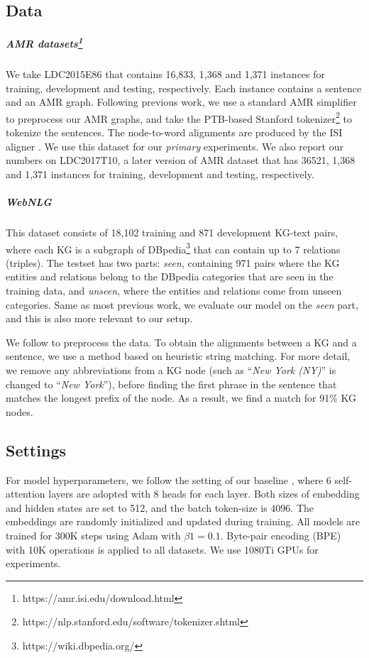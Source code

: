 \documentclass[11pt,a4paper]{article}
\begin{document}
\subsection{Data}


\subparagraph{AMR datasets\footnote{https://amr.isi.edu/download.html}} 
We take LDC2015E86 that contains 16,833, 1,368 and 1,371 instances for training, development and testing, respectively.
Each instance contains a sentence and an AMR graph.
Following previous work, we use a standard AMR simplifier \citep{konstas2017neural} to preprocess our AMR graphs, and take the PTB-based Stanford tokenizer\footnote{https://nlp.stanford.edu/software/tokenizer.shtml} to tokenize the sentences.
The node-to-word alignments are produced by the ISI aligner \citep{pourdamghani2014aligning}.
We use this dataset for our \emph{primary} experiments.
We also report our numbers on LDC2017T10, a later version of AMR dataset that has 36521, 1,368 and 1,371 instances for training, development and testing, respectively.


\subparagraph{WebNLG \citep{gardent2017webnlg}}
This dataset consists of 18,102 training and 871 development KG-text pairs, where each KG is a subgraph of DBpedia\footnote{https://wiki.dbpedia.org/} that can contain up to 7 relations (triples).
The testset has two parts: \emph{seen}, containing 971 pairs where the KG entities and relations belong to the DBpedia categories that are seen in the training data, and \emph{unseen}, where the entities and relations come from unseen categories.
Same as most previous work, we evaluate our model on the \emph{seen} part, and this is also more relevant to our setup.


We follow \citet{marcheggiani2018deep} to preprocess the data. 
To obtain 
the alignments between a KG and a sentence,
we use a method based on heuristic string matching.
For more detail, we remove any abbreviations from a KG node (such as ``\emph{New York (NY)}'' is changed to ``\emph{New York}''), before finding the first phrase in the sentence that matches the longest prefix of the node.
As a result, we find a match for 91\% KG nodes.


\subsection{Settings}


For model hyperparameters, we follow the setting of our baseline \citep{zhu2019modeling}, where 6 self-attention layers are adopted with 8 heads for each layer.
Both sizes of embedding and hidden states are set to 512, and the batch token-size is 4096.
The embeddings are randomly initialized and updated during training.
All models are trained for 300K steps using Adam \citep{kingma2014adam} with $\beta1=0.1$.
Byte-pair encoding (BPE) \citep{sennrich2016neural} with 10K operations is applied to all datasets.
We use 1080Ti GPUs for experiments.
\end{document}
